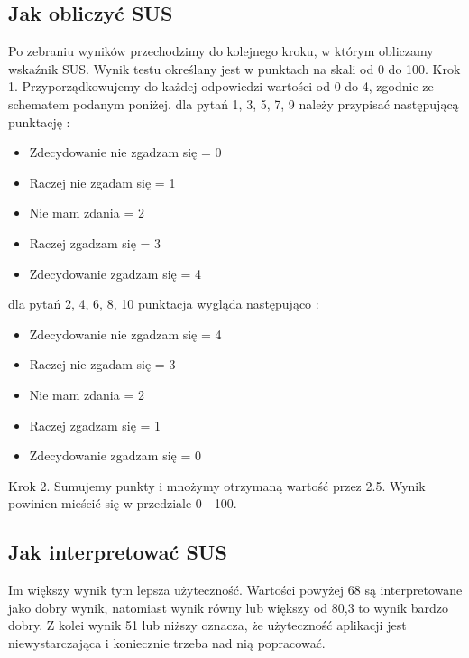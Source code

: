 \subsection{Jak obliczyć SUS}
Po zebraniu wyników przechodzimy do kolejnego kroku, w którym obliczamy wskaźnik SUS. Wynik
testu określany jest w punktach na skali od 0 do 100. \newline
Krok 1. Przyporządkowujemy do każdej odpowiedzi wartości od 0 do 4, zgodnie ze schematem podanym
poniżej. \newline
\newline
dla pytań 1, 3, 5, 7, 9 należy przypisać następującą punktację :
\begin{itemize}
	\item Zdecydowanie nie zgadzam się = 0
	\item Raczej nie zgadam się = 1
	\item Nie mam zdania = 2
	\item Raczej zgadzam się = 3
	\item Zdecydowanie zgadzam się = 4
\end{itemize}
dla pytań 2, 4, 6, 8, 10 punktacja wygląda następująco :
\begin{itemize}
	\item Zdecydowanie nie zgadzam się = 4
	\item Raczej nie zgadam się = 3
	\item Nie mam zdania = 2
	\item Raczej zgadzam się = 1
	\item Zdecydowanie zgadzam się = 0
\end{itemize}
Krok 2. Sumujemy punkty i mnożymy otrzymaną wartość przez 2.5.
Wynik powinien mieścić się w przedziale 0 - 100.
\subsection{Jak interpretować SUS}
Im większy wynik tym lepsza użyteczność. Wartości powyżej 68 są interpretowane jako dobry wynik,
natomiast wynik równy lub większy od 80,3 to wynik bardzo dobry. Z kolei wynik 51 lub niższy oznacza, że
użyteczność aplikacji jest niewystarczająca i koniecznie trzeba nad nią popracować.
